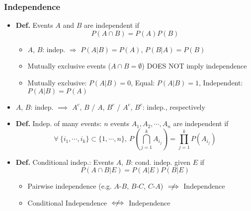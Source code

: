 \subsubsection*{Independence}
\begin{itemize}
    \item \textbf{Def.} Events $A$ and $B$ are independent if
    \begin{equation}
        P(A\cap B)=P(A)P(B)
    \end{equation}
    \begin{itemize}
        \item $A$, $B$: indep. $\Rightarrow$ $P(A|B)=P(A)$, $P(B|A)=P(B)$
        \item Mutually exclusive events ($A\cap B=\emptyset$) DOES NOT imply independence
        \item Mutually exclusive: $P(A|B)=0$, Equal: $P(A|B)=1$, Independent: $P(A|B)=P(A)$
    \end{itemize}
    \item $A$, $B$: indep. $\implies$ $A^c$, $B$ / $A$, $B^c$ / $A^c$, $B^c$: indep., respectively
    \item \textbf{Def.} Indep. of many events: $n$ events $A_1,A_2,\cdots,A_n$ are independent if
    \begin{equation}
        \forall~\{i_1,\cdots,i_k\}\subset\{1,\cdots,n\},~P\left(\bigcap_{j=1}^kA_{i_j}\right)=\prod_{j=1}^kP(A_{i_j})
    \end{equation}
    \item \textbf{Def.} Conditional indep.: Events $A$, $B$: cond. indep. given $E$ if
    \begin{equation}
        P(A\cap B|E)=P(A|E)P(B|E)
    \end{equation}
    \begin{itemize}
        \item Pairwise independence (e.g. $A$-$B$, $B$-$C$, $C$-$A$) $\centernot\implies$ Independence
        \item Conditional Independence $\centernot\iff$ Independence
    \end{itemize}
\end{itemize}
